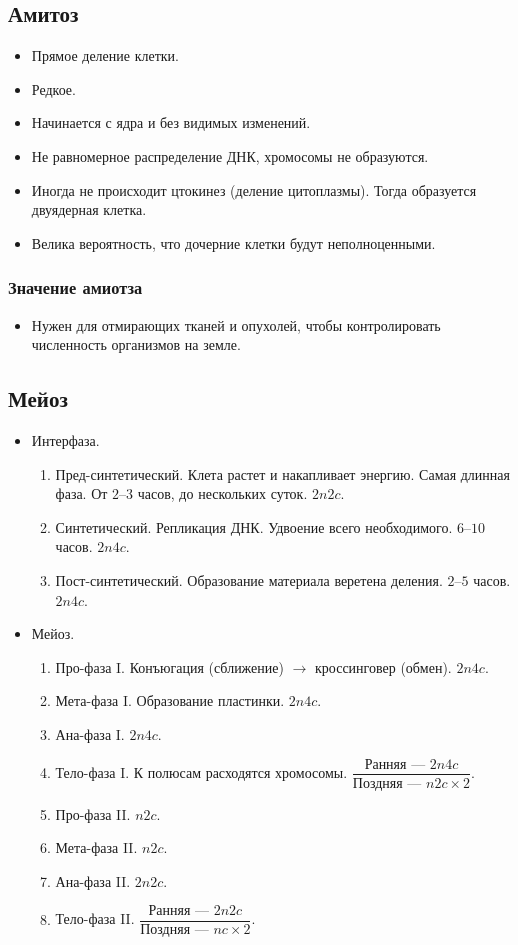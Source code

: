 \documentclass[12pt]{article}
\begin{document}
	\subsection{Амитоз}
	\begin{itemize}
		\item Прямое деление клетки.
		\item Редкое.
		\item Начинается с ядра и без видимых изменений.
		\item Не равномерное распределение ДНК, хромосомы не образуются.
		\item Иногда не происходит цтокинез (деление цитоплазмы). Тогда образуется двуядерная клетка.
		\item Велика вероятность, что дочерние клетки будут неполноценными.
	\end{itemize}
	\subsubsection{Значение амиотза}
	\begin{itemize}
		\item Нужен для отмирающих тканей и опухолей, чтобы контролировать численность организмов на земле.
	\end{itemize}
	\subsection{Мейоз}
	\begin{itemize}
		\item Интерфаза.
		\begin{enumerate}
			\item Пред-синтетический. Клета растет и накапливает энергию. Самая длинная фаза. От $2$--$3$ часов, до нескольких суток. $2n2c$.
			\item Синтетический. Репликация ДНК. Удвоение всего необходимого. $6$--$10$ часов. $2n4c$.
			\item Пост-синтетический. Образование материала веретена деления. $2$--$5$ часов. $2n4c$.
		\end{enumerate}
		\item Мейоз.
		\begin{enumerate}
			\item Про-фаза I. Конъюгация (сближение) $\rightarrow$ кроссинговер (обмен). $2n4c$.
			\item Мета-фаза I. Образование пластинки. $2n4c$.
			\item Ана-фаза I. $2n4c$.
			\item Тело-фаза I. К полюсам расходятся хромосомы. $\dfrac{\text{Ранняя~--- } 2n4c}{\text{Поздняя~--- } n2c \times 2}$.
			\item Про-фаза II. $n2c$.
			\item Мета-фаза II. $n2c$.
			\item Ана-фаза II. $2n2c$.
			\item Тело-фаза II. $\dfrac{\text{Ранняя~--- } 2n2c}{\text{Поздняя~--- } nc \times 2}$.
		\end{enumerate}
	\end{itemize}
\end{document}
